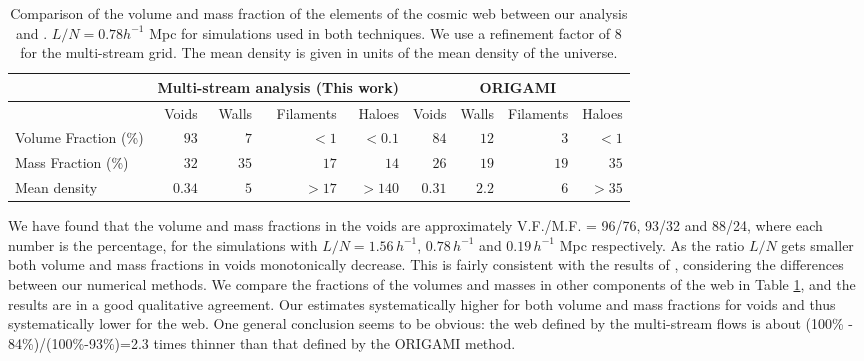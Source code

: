  \begin{table}
 \centering
  \caption{Comparison of the volume and mass fraction of the elements of the cosmic web between our analysis and \citet{Falck2015}. $ L/N = 0.78 h^{-1}$ Mpc for simulations used in both techniques. We use a refinement factor of 8 for the multi-stream grid. The mean density is given in units of the mean density of the universe. }
\begin{tabular}{|l|r|r|r|r|r|r|r|r|}
\hline
\multicolumn{1}{|c|}{} & \multicolumn{4}{l|}{Multi-stream analysis (This work)} & \multicolumn{4}{c|}{ORIGAMI \citep{Falck2015}}    \\ \hline
                       & Voids & Walls & Filaments & Haloes  & Voids & Walls & Filaments & Haloes \\ \hline
Volume Fraction (\%)                 & $93$   & $7$    & $< 1$      & $< 0.1$ & $84$   & $12$   & $3$        & $< 1$  \\ \hline
Mass Fraction   (\%)               & $32$   & $35$   & $17$       & $14$    & $26$   & $19$   & $19$       & $35$   \\ \hline
Mean density                    & $0.34$ & $5$    & $>17$      & $>140$  & $0.31$ & $2.2$  & $6$        & $>35$  \\ \hline
\end{tabular}
 \label{tab:Compare}
\end{table}

We have found that the volume and mass fractions in the voids  are approximately V.F./M.F. = 96/76, 93/32  and 88/24, where each number
is the percentage, for the simulations with  $L/N = 1.56 \,h^{-1}$, $0.78 \,h^{-1}$  and $0.19 \,h^{-1}$ Mpc respectively. As the ratio $L/N$ 
gets smaller both volume and mass fractions in  voids monotonically decrease.  
This is fairly consistent with the results of \citet{Falck2015}, considering the differences between our numerical methods. We compare the fractions of the volumes and masses
in other components of the web in Table \ref{tab:Compare}, and the results are in a good qualitative agreement.
Our estimates systematically higher for both volume and mass fractions for voids and thus systematically lower for the web. 
One general conclusion seems to be obvious: the web defined by the multi-stream flows is about  (100\% - 84\%)/(100\%-93\%)=2.3  times  thinner than that defined by the ORIGAMI  method. 


